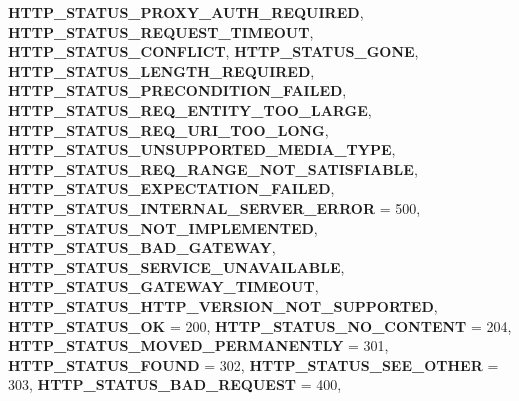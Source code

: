 \begin{DoxyCompactItemize}
{\bfseries H\+T\+T\+P\+\_\+\+S\+T\+A\+T\+U\+S\+\_\+\+P\+R\+O\+X\+Y\+\_\+\+A\+U\+T\+H\+\_\+\+R\+E\+Q\+U\+I\+R\+ED}, 
{\bfseries H\+T\+T\+P\+\_\+\+S\+T\+A\+T\+U\+S\+\_\+\+R\+E\+Q\+U\+E\+S\+T\+\_\+\+T\+I\+M\+E\+O\+UT}, 
\newline
{\bfseries H\+T\+T\+P\+\_\+\+S\+T\+A\+T\+U\+S\+\_\+\+C\+O\+N\+F\+L\+I\+CT}, 
{\bfseries H\+T\+T\+P\+\_\+\+S\+T\+A\+T\+U\+S\+\_\+\+G\+O\+NE}, 
{\bfseries H\+T\+T\+P\+\_\+\+S\+T\+A\+T\+U\+S\+\_\+\+L\+E\+N\+G\+T\+H\+\_\+\+R\+E\+Q\+U\+I\+R\+ED}, 
{\bfseries H\+T\+T\+P\+\_\+\+S\+T\+A\+T\+U\+S\+\_\+\+P\+R\+E\+C\+O\+N\+D\+I\+T\+I\+O\+N\+\_\+\+F\+A\+I\+L\+ED}, 
\newline
{\bfseries H\+T\+T\+P\+\_\+\+S\+T\+A\+T\+U\+S\+\_\+\+R\+E\+Q\+\_\+\+E\+N\+T\+I\+T\+Y\+\_\+\+T\+O\+O\+\_\+\+L\+A\+R\+GE}, 
{\bfseries H\+T\+T\+P\+\_\+\+S\+T\+A\+T\+U\+S\+\_\+\+R\+E\+Q\+\_\+\+U\+R\+I\+\_\+\+T\+O\+O\+\_\+\+L\+O\+NG}, 
{\bfseries H\+T\+T\+P\+\_\+\+S\+T\+A\+T\+U\+S\+\_\+\+U\+N\+S\+U\+P\+P\+O\+R\+T\+E\+D\+\_\+\+M\+E\+D\+I\+A\+\_\+\+T\+Y\+PE}, 
{\bfseries H\+T\+T\+P\+\_\+\+S\+T\+A\+T\+U\+S\+\_\+\+R\+E\+Q\+\_\+\+R\+A\+N\+G\+E\+\_\+\+N\+O\+T\+\_\+\+S\+A\+T\+I\+S\+F\+I\+A\+B\+LE}, 
\newline
{\bfseries H\+T\+T\+P\+\_\+\+S\+T\+A\+T\+U\+S\+\_\+\+E\+X\+P\+E\+C\+T\+A\+T\+I\+O\+N\+\_\+\+F\+A\+I\+L\+ED}, 
{\bfseries H\+T\+T\+P\+\_\+\+S\+T\+A\+T\+U\+S\+\_\+\+I\+N\+T\+E\+R\+N\+A\+L\+\_\+\+S\+E\+R\+V\+E\+R\+\_\+\+E\+R\+R\+OR} = 500, 
{\bfseries H\+T\+T\+P\+\_\+\+S\+T\+A\+T\+U\+S\+\_\+\+N\+O\+T\+\_\+\+I\+M\+P\+L\+E\+M\+E\+N\+T\+ED}, 
{\bfseries H\+T\+T\+P\+\_\+\+S\+T\+A\+T\+U\+S\+\_\+\+B\+A\+D\+\_\+\+G\+A\+T\+E\+W\+AY}, 
\newline
{\bfseries H\+T\+T\+P\+\_\+\+S\+T\+A\+T\+U\+S\+\_\+\+S\+E\+R\+V\+I\+C\+E\+\_\+\+U\+N\+A\+V\+A\+I\+L\+A\+B\+LE}, 
{\bfseries H\+T\+T\+P\+\_\+\+S\+T\+A\+T\+U\+S\+\_\+\+G\+A\+T\+E\+W\+A\+Y\+\_\+\+T\+I\+M\+E\+O\+UT}, 
{\bfseries H\+T\+T\+P\+\_\+\+S\+T\+A\+T\+U\+S\+\_\+\+H\+T\+T\+P\+\_\+\+V\+E\+R\+S\+I\+O\+N\+\_\+\+N\+O\+T\+\_\+\+S\+U\+P\+P\+O\+R\+T\+ED}, 
{\bfseries H\+T\+T\+P\+\_\+\+S\+T\+A\+T\+U\+S\+\_\+\+OK} = 200, 
\newline
{\bfseries H\+T\+T\+P\+\_\+\+S\+T\+A\+T\+U\+S\+\_\+\+N\+O\+\_\+\+C\+O\+N\+T\+E\+NT} = 204, 
{\bfseries H\+T\+T\+P\+\_\+\+S\+T\+A\+T\+U\+S\+\_\+\+M\+O\+V\+E\+D\+\_\+\+P\+E\+R\+M\+A\+N\+E\+N\+T\+LY} = 301, 
{\bfseries H\+T\+T\+P\+\_\+\+S\+T\+A\+T\+U\+S\+\_\+\+F\+O\+U\+ND} = 302, 
{\bfseries H\+T\+T\+P\+\_\+\+S\+T\+A\+T\+U\+S\+\_\+\+S\+E\+E\+\_\+\+O\+T\+H\+ER} = 303, 
\newline
{\bfseries H\+T\+T\+P\+\_\+\+S\+T\+A\+T\+U\+S\+\_\+\+B\+A\+D\+\_\+\+R\+E\+Q\+U\+E\+ST} = 400, 

\end{DoxyCompactItemize}

